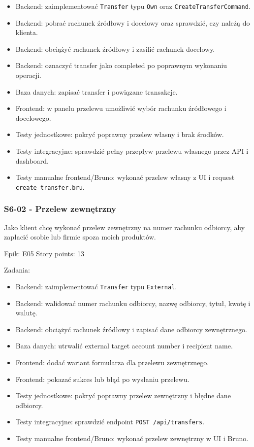 \documentclass[12pt,a4paper]{article}
\begin{document}
\begin{itemize}
\item Backend: zaimplementować \texttt{Transfer} typu \texttt{Own} oraz \texttt{CreateTransferCommand}.
\item Backend: pobrać rachunek źródłowy i docelowy oraz sprawdzić, czy należą do klienta.
\item Backend: obciążyć rachunek źródłowy i zasilić rachunek docelowy.
\item Backend: oznaczyć transfer jako completed po poprawnym wykonaniu operacji.
\item Baza danych: zapisać transfer i powiązane transakcje.
\item Frontend: w panelu przelewu umożliwić wybór rachunku źródłowego i docelowego.
\item Testy jednostkowe: pokryć poprawny przelew własny i brak środków.
\item Testy integracyjne: sprawdzić pełny przepływ przelewu własnego przez API i dashboard.
\item Testy manualne frontend/Bruno: wykonać przelew własny z UI i request \texttt{create-transfer.bru}.
\end{itemize}

\subsubsection*{S6-02 - Przelew zewnętrzny}

Jako klient chcę wykonać przelew zewnętrzny na numer rachunku odbiorcy, aby zapłacić osobie lub firmie spoza moich produktów.

Epik: E05
Story points: 13

Zadania:

\begin{itemize}
\item Backend: zaimplementować \texttt{Transfer} typu \texttt{External}.
\item Backend: walidować numer rachunku odbiorcy, nazwę odbiorcy, tytuł, kwotę i walutę.
\item Backend: obciążyć rachunek źródłowy i zapisać dane odbiorcy zewnętrznego.
\item Baza danych: utrwalić external target account number i recipient name.
\item Frontend: dodać wariant formularza dla przelewu zewnętrznego.
\item Frontend: pokazać sukces lub błąd po wysłaniu przelewu.
\item Testy jednostkowe: pokryć poprawny przelew zewnętrzny i błędne dane odbiorcy.
\item Testy integracyjne: sprawdzić endpoint \texttt{POST /api/transfers}.
\item Testy manualne frontend/Bruno: wykonać przelew zewnętrzny w UI i Bruno.
\end{itemize}
\end{document}
